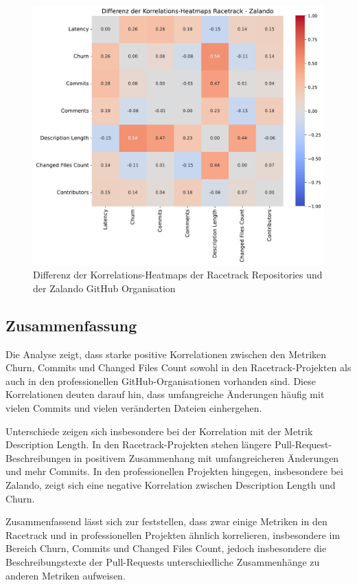 \begin{figure}[htbp]
\includegraphics[width=\textwidth]{Figures/diff-korrelationsmatrix-racetrack-zalando.pdf}
\caption{Differenz der Korrelations-Heatmaps der Racetrack Repositories und der Zalando GitHub Organisation}
\label{fig:diff-korrelationsmatrix-racetrack-zalando}
\end{figure}



\subsection{Zusammenfassung}
Die Analyse zeigt, dass starke positive Korrelationen zwischen den Metriken Churn, Commits und Changed Files Count sowohl in den Racetrack-Projekten als auch in den professionellen GitHub-Organisationen vorhanden sind. Diese Korrelationen deuten darauf hin, dass umfangreiche Änderungen häufig mit vielen Commits und vielen veränderten Dateien einhergehen.

Unterschiede zeigen sich insbesondere bei der Korrelation mit der Metrik Description Length. In den Racetrack-Projekten stehen längere Pull-Request-Beschreibungen in positivem Zusammenhang mit umfangreicheren Änderungen und mehr Commits. 
In den professionellen Projekten hingegen, insbesondere bei Zalando, zeigt sich eine negative Korrelation zwischen Description Length und Churn. 

Zusammenfassend lässt sich zur  feststellen, dass zwar einige Metriken in den Racetrack und in professionellen Projekten ähnlich korrelieren, insbesondere im Bereich Churn, Commits und Changed Files Count, jedoch insbesondere die Beschreibungstexte der Pull-Requests unterschiedliche Zusammenhänge zu anderen Metriken aufweisen.






